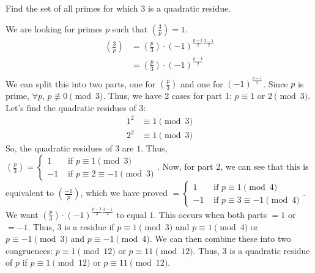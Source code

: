 \documentclass{article}
\newcommand{\legendre}[2]{\left(\frac{#1}{#2}\right)}
\begin{document}
\begin{problem}{}{}
    Find the set of all primes for which 3 is a quadratic residue.
\end{problem}
\begin{solution}{}{}
    We are looking for primes $p$ such that $\legendre{3}{p}=1$.
    \begin{align*}
        \legendre{3}{p} &=\legendre{p}{3}\cdot(-1)^{\frac{p-1}{2}\frac{3-1}{2}}\\
        &=\legendre{p}{3}\cdot(-1)^{\frac{p-1}{2}}\\
    \end{align*}
    We can split this into two parts, one for $\legendre{p}{3}$ and one for $(-1)^{\frac{p-1}{2}}$. Since $p$ is prime, $\forall p$, $p\not\equiv 0\pmod{3}$. Thus, we have 2 cases for part 1: $p\equiv 1\text{ or }2\pmod{3}$. Let's find the quadratic residues of $3$:
    \begin{align*}
        1^2 &\equiv 1\pmod{3}\\
        2^2 &\equiv 1\pmod{3}
    \end{align*}
    So, the quadratic residues of $3$ are $1$. Thus, $\legendre{p}{3}=\begin{cases}
        1 &\text{ if }p\equiv 1\pmod{3}\\
        -1 &\text{ if }p\equiv 2\equiv-1\pmod{3}
    \end{cases}$. Now, for part 2, we can see that this is equivalent to $\legendre{-1}{p}$, which we have proved $=\begin{cases}
        1 &\text{ if }p\equiv 1\pmod{4}\\
        -1 &\text{ if }p\equiv 3\equiv-1\pmod{4}
    \end{cases}$. We want $\legendre{p}{3}\cdot(-1)^{\frac{p-1}{2}\frac{3-1}{2}}$ to equal $1$. This occurs when both parts $=1$ or $=-1$. Thus, 3 is a residue if $p\equiv 1\pmod{3}$ and $p\equiv 1\pmod{4}$ or $p\equiv -1\pmod{3}$ and $p\equiv -1\pmod{4}$. We can then combine these into two congruences: $p\equiv 1\pmod{12}$ or $p\equiv 11\pmod{12}$. Thus, $3$ is a quadratic residue of $p$ if $p\equiv 1\pmod{12}\text{ or } p\equiv11\pmod{12}$.
\end{solution}
\end{document}
